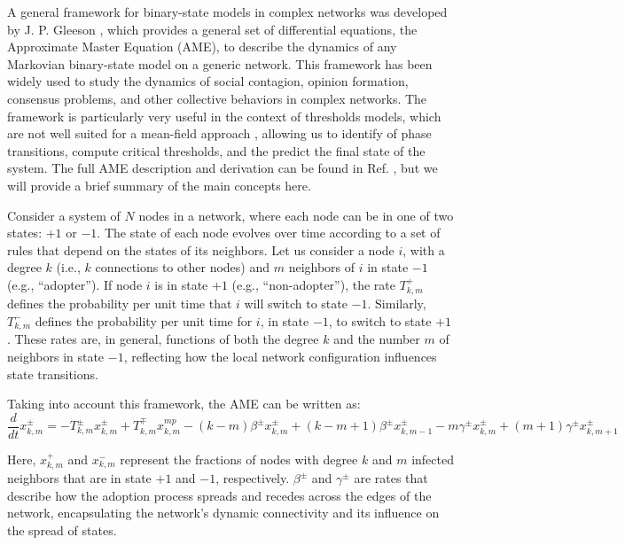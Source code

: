 A general framework for binary-state models in complex networks was developed by J. P. Gleeson \cite{gleeson-2011,gleeson-2013}, which provides a general set of differential equations, the Approximate Master Equation (AME), to describe the dynamics of any Markovian binary-state model on a generic network. This framework has been widely used to study the dynamics of social contagion, opinion formation, consensus problems, and other collective behaviors in complex networks. The framework is particularly very useful in the context of thresholds models, which are not well suited for a mean-field approach \cite{gleeson-2007}, allowing us to identify of phase transitions, compute critical thresholds, and the predict the final state of the system. The full AME description and derivation can be found in Ref. \cite{gleeson-2013}, but we will provide a brief summary of the main concepts here.

Consider a system of $N$ nodes in a network, where each node can be in one of two states: $+1$ or $-1$. The state of each node evolves over time according to a set of rules that depend on the states of its neighbors. Let us consider a node $i$, with a degree $k$ (i.e., $k$ connections to other nodes) and $m$ neighbors of $i$ in state $-1$ (e.g., ``adopter''). If node $i$ is in state $+1$ (e.g., ``non-adopter''), the rate \( T^{+}_{k,m} \) defines the probability per unit time that $i$ will switch to state $-1$. Similarly, \( T^{-}_{k,m} \) defines the probability per unit time for $i$, in state $-1$, to switch to state $+1$. These rates are, in general, functions of both the degree $k$ and the number $m$ of neighbors in state $-1$, reflecting how the local network configuration influences state transitions.

Taking into account this framework, the AME can be written as:
\begin{equation}
    \frac{d}{dt} x^{\pm}_{k,m} = -T^{\pm}_{k,m} x^{\pm}_{k,m} + T^{\mp}_{k,m} x^{mp}_{k,m} - (k-m) \beta^{\pm} x^{\pm}_{k,m} + (k-m+1) \beta^{\pm} x^{\pm}_{k,m-1} - m \gamma^{\pm} x^{\pm}_{k,m} + (m+1) \gamma^{\pm} x^{\pm}_{k,m+1}
\end{equation}

Here, $x^{+}_{k,m}$ and $x^{-}_{k,m}$ represent the fractions of nodes with degree $k$ and $m$ infected neighbors that are in state $+1$ and $-1$, respectively. $\beta^{\pm}$ and $\gamma^{\pm}$ are rates that describe how the adoption process spreads and recedes across the edges of the network, encapsulating the network's dynamic connectivity and its influence on the spread of states.


